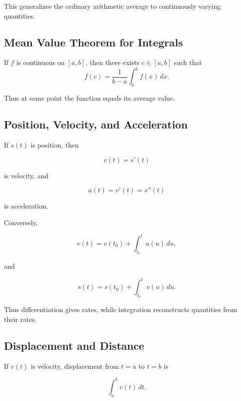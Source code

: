 This generalizes the ordinary arithmetic average to continuously varying
quantities.

\subsection{Mean Value Theorem for Integrals}
\label{subsec:mean-value-integrals}

\begin{theorem}
If \(f\) is continuous on \([a,b]\), then there exists \(c\in[a,b]\) such
that
\[ f(c)=\frac1{b-a}\int_a^b f(x)\,dx. \]
\end{theorem}

Thus at some point the function equals its average value.

\subsection{Position, Velocity, and Acceleration}
\label{subsec:motion-calculus}

If \(s(t)\) is position, then

\[ v(t)=s'(t) \]

is velocity, and

\[ a(t)=v'(t)=s''(t) \]

is acceleration.

Conversely,

\[ v(t)=v(t_0)+\int_{t_0}^t a(u)\,du, \]

and

\[ s(t)=s(t_0)+\int_{t_0}^t v(u)\,du. \]

Thus differentiation gives rates, while integration reconstructs quantities
from their rates.

\subsection{Displacement and Distance}
\label{subsec:displacement-distance}

If \(v(t)\) is velocity, displacement from \(t=a\) to \(t=b\) is

\[ \int_a^b v(t)\,dt. \]


